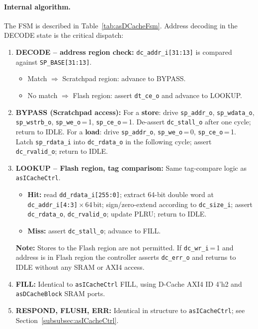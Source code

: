 \paragraph{Internal algorithm.}
The FSM is described in Table~\ref{tab:asDCacheFsm}.
Address decoding in the DECODE state is the critical dispatch:

\begin{enumerate}
  \item \textbf{DECODE -- address region check:}
    \texttt{dc\_addr\_i[31:13]} is compared against
    \texttt{SP\_BASE[31:13]}.
    \begin{itemize}
      \item Match $\Rightarrow$ Scratchpad region: advance to BYPASS.
      \item No match $\Rightarrow$ Flash region: assert \texttt{dt\_ce\_o}
        and advance to LOOKUP.
    \end{itemize}

  \item \textbf{BYPASS (Scratchpad access):}
    For a \textbf{store}: drive \texttt{sp\_addr\_o},
    \texttt{sp\_wdata\_o}, \texttt{sp\_wstrb\_o},
    \texttt{sp\_we\_o}\,=\,1, \texttt{sp\_ce\_o}\,=\,1.
    De-assert \texttt{dc\_stall\_o} after one cycle; return to IDLE.
    For a \textbf{load}: drive \texttt{sp\_addr\_o},
    \texttt{sp\_we\_o}\,=\,0, \texttt{sp\_ce\_o}\,=\,1.
    Latch \texttt{sp\_rdata\_i} into \texttt{dc\_rdata\_o} in the
    following cycle; assert \texttt{dc\_rvalid\_o}; return to IDLE.

  \item \textbf{LOOKUP -- Flash region, tag comparison:}
    Same tag-compare logic as \texttt{asICacheCtrl}.
    \begin{itemize}
      \item \textbf{Hit:} read \texttt{dd\_rdata\_i[255:0]};
        extract 64-bit double word at
        \texttt{dc\_addr\_i[4:3]}\,$\times$\,64\,bit;
        sign/zero-extend according to \texttt{dc\_size\_i};
        assert \texttt{dc\_rdata\_o}, \texttt{dc\_rvalid\_o};
        update PLRU; return to IDLE.
      \item \textbf{Miss:} assert \texttt{dc\_stall\_o}; advance to FILL.
    \end{itemize}
    \textbf{Note:} Stores to the Flash region are not permitted.
    If \texttt{dc\_wr\_i}\,=\,1 and address is in Flash region the
    controller asserts \texttt{dc\_err\_o} and returns to IDLE without
    any SRAM or AXI4 access.

  \item \textbf{FILL:}
    Identical to \texttt{asICacheCtrl} FILL, using D-Cache AXI4 ID
    4'h2 and \texttt{asDCacheBlock} SRAM ports.

  \item \textbf{RESPOND, FLUSH, ERR:}
    Identical in structure to \texttt{asICacheCtrl}; see
    Section~\ref{subsubsec:asICacheCtrl}.
\end{enumerate}

